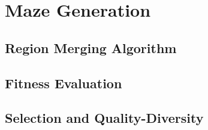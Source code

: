 \chapter{Maze Generation}

\section{Region Merging Algorithm}

\section{Fitness Evaluation}

\section{Selection and Quality-Diversity}

